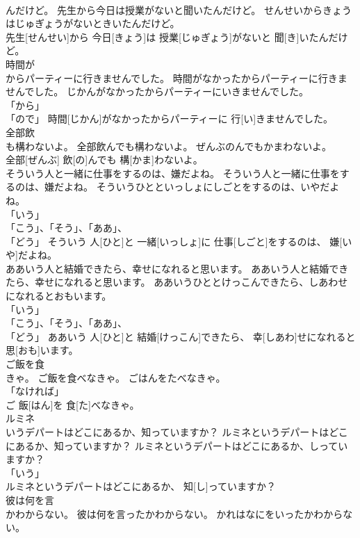 \documentclass[8pt]{extreport}
\begin{document}
\begin{CJK}{UTF8}{min}
\\	んだけど。	先生から今日は授業がないと聞いたんだけど。	せんせいからきょうはじゅぎょうがないときいたんだけど。	
\\	先生[せんせい]から 今日[きょう]は 授業[じゅぎょう]がないと 聞[き]いたんだけど。		
\\	時間が
\\	からパーティーに行きませんでした。	時間がなかったからパーティーに行きませんでした。	じかんがなかったからパーティーにいきませんでした。	
\\	「から」 
\\	「ので」	時間[じかん]がなかったからパーティーに 行[い]きませんでした。		
\\	全部飲
\\	も構わないよ。	全部飲んでも構わないよ。	ぜんぶのんでもかまわないよ。	
\\	全部[ぜんぶ] 飲[の]んでも 構[かま]わないよ。		
\\	そういう人と一緒に仕事をするのは、嫌だよね。	そういう人と一緒に仕事をするのは、嫌だよね。	そういうひとといっしょにしごとをするのは、いやだよね。	
\\	「いう」 
\\	「こう」、「そう」、「ああ」、
\\	「どう」	そういう 人[ひと]と 一緒[いっしょ]に 仕事[しごと]をするのは、 嫌[いや]だよね。		
\\	ああいう人と結婚できたら、幸せになれると思います。	ああいう人と結婚できたら、幸せになれると思います。	ああいうひととけっこんできたら、しあわせになれるとおもいます。	
\\	「いう」 
\\	「こう」、「そう」、「ああ」、
\\	「どう」	ああいう 人[ひと]と 結婚[けっこん]できたら、 幸[しあわ]せになれると 思[おも]います。		
\\	ご飯を食
\\	きゃ。	ご飯を食べなきゃ。	ごはんをたべなきゃ。	
\\	「なければ」
\\	ご 飯[はん]を 食[た]べなきゃ。		
\\	ルミネ
\\	いうデパートはどこにあるか、知っていますか？	ルミネというデパートはどこにあるか、知っていますか？	ルミネというデパートはどこにあるか、しっていますか？	
\\	「いう」 
\\	ルミネというデパートはどこにあるか、 知[し]っていますか？		
\\	彼は何を言
\\	かわからない。	彼は何を言ったかわからない。	かれはなにをいったかわからない。	

\end{CJK}
\end{document}
